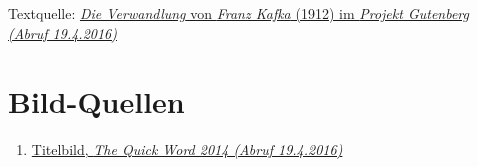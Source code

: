 \documentclass[12pt,a4paper,twoside,titlepage]{article}
\let\oldsection\section
\renewcommand\section{\clearpage\oldsection}
\begin{document}
	
	\begin{thebibliography}{9}
		 Textquelle: \href{http://gutenberg.spiegel.de/buch/die-verwandlung-165/1}{\textit{Die Verwandlung} von \textit{Franz Kafka} (1912) im \textit{Projekt Gutenberg (Abruf 19.4.2016)}}
		
%			
	\end{thebibliography}
	
	\appendix
	
	\section{Bild-Quellen}
	\begin{enumerate}
		\item \label{qui14} \href{https://thequickword.wordpress.com/2014/01/28/dyslexicatheist-book-review-franz-kafka-the-metamorphosis-die-verwandlung/}{Titelbild, \textit{The Quick Word 2014 (Abruf 19.4.2016)}}
	\end{enumerate}
	
	
	
	
\end{document}
